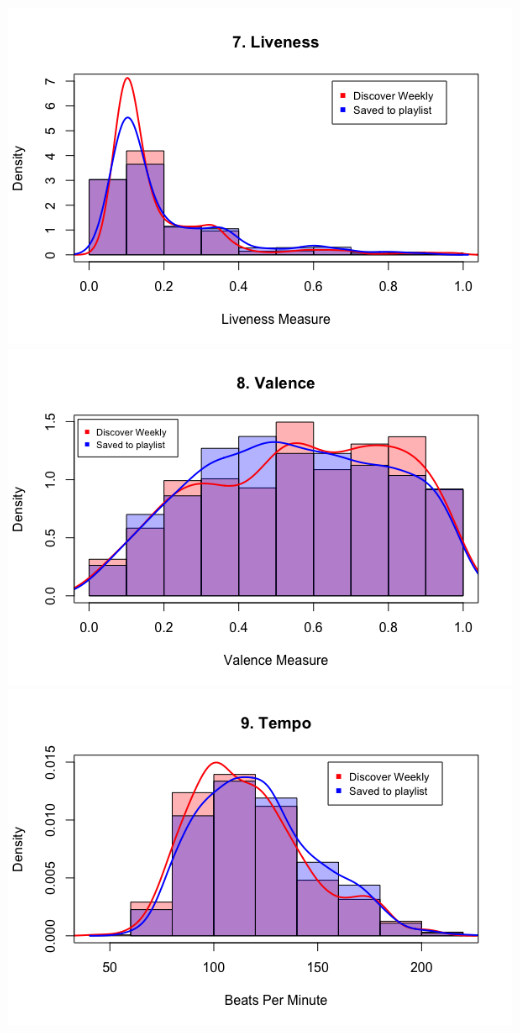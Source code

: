 \documentclass{article}
\begin{document}
		\includegraphics[width=\textwidth]{7_liveness}\\
		\includegraphics[width=\textwidth]{8_valence}\\
		\includegraphics[width=\textwidth]{9_tempo}\\
\end{document}
